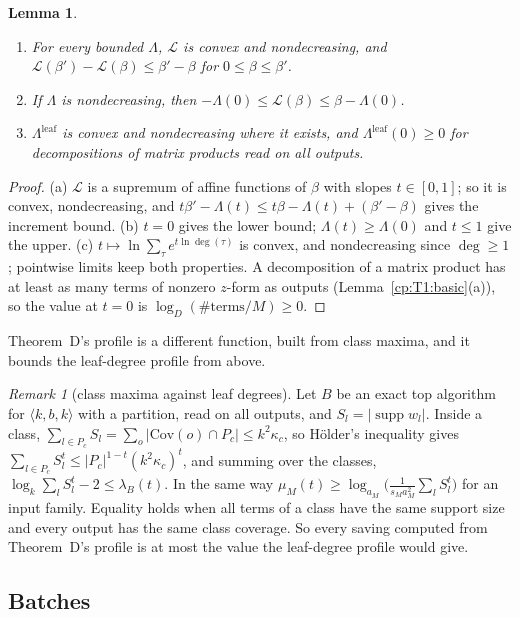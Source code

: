 \documentclass[11pt]{article}
\newtheorem{lemma}[theorem]{Lemma}
\theoremstyle{definition}
\theoremstyle{remark}
\newtheorem{remark}[theorem]{Remark}
\newcommand{\abs}[1]{\lvert #1\rvert}
\DeclareMathOperator{\supp}{supp}
\newcommand{\mat}[3]{\langle #1,#2,#3\rangle} %
\newcommand{\Cov}{\mathrm{Cov}}               %
\newcommand{\lamB}{\lambda_B}                 %
\newcommand{\ThmD}{Theorem~D}                               %
\newcommand{\Lleaf}{\Lambda^{\mathrm{leaf}}}          %
\newcommand{\Leg}{\mathcal{L}}                        %
\begin{document}
\begin{lemma}\label{cp:F1:basic}
\begin{enumerate}[label=(\alph*)]
\item For every bounded $\Lambda$, $\Leg$ is convex and nondecreasing, and $\Leg(\beta')-\Leg(\beta)\le\beta'-\beta$ for $0\le\beta\le\beta'$.
\item If $\Lambda$ is nondecreasing, then $-\Lambda(0)\le\Leg(\beta)\le\beta-\Lambda(0)$.
\item $\Lleaf$ is convex and nondecreasing where it exists, and $\Lleaf(0)\ge0$ for decompositions of matrix products read on all outputs.
\end{enumerate}
\end{lemma}

\begin{proof}
(a) $\Leg$ is a supremum of affine functions of $\beta$ with slopes $t\in[0,1]$; so it is convex, nondecreasing, and $t\beta'-\Lambda(t)\le t\beta-\Lambda(t)+(\beta'-\beta)$ gives the increment bound. (b) $t=0$ gives the lower bound; $\Lambda(t)\ge\Lambda(0)$ and $t\le1$ give the upper. (c) $t\mapsto\ln\sum_\tau e^{t\ln\deg(\tau)}$ is convex, and nondecreasing since $\deg\ge1$; pointwise limits keep both properties. A decomposition of a matrix product has at least as many terms of nonzero $z$-form as outputs (Lemma~\ref{cp:T1:basic}(a)), so the value at $t=0$ is $\log_D(\#\text{terms}/M)\ge0$.
\end{proof}

\ThmD's profile is a different function, built from class maxima, and it bounds the leaf-degree profile from above.

\begin{remark}[class maxima against leaf degrees]\label{cp:F1:thmD}
Let $B$ be an exact top algorithm for $\mat kbk$ with a partition, read on all outputs, and $S_l=\abs{\supp w_l}$. Inside a class, $\sum_{l\in P_c}S_l=\sum_o\abs{\Cov(o)\cap P_c}\le k^2\kappa_c$, so Hölder's inequality gives $\sum_{l\in P_c}S_l^t\le\abs{P_c}^{1-t}(k^2\kappa_c)^t$, and summing over the classes, $\log_k\sum_lS_l^t-2\le\lamB(t)$. In the same way $\mu_M(t)\ge\log_{a_M}\bigl(\frac1{s_Ma_M^2}\sum_lS_l^t\bigr)$ for an input family. Equality holds when all terms of a class have the same support size and every output has the same class coverage. So every saving computed from \ThmD's profile is at most the value the leaf-degree profile would give.
\end{remark}

\subsection{Batches}\label{cp:sec:F:batch}
\end{document}
